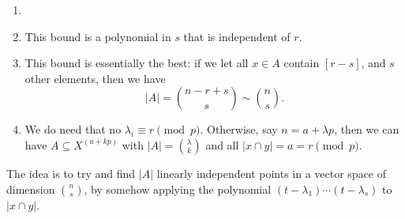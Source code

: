 \documentclass[12pt]{article}
\begin{document}
\begin{remark}
	\begin{enumerate}
		\item[]
		\item This bound is a polynomial in $s$ that is independent of $r$.
		\item This bound is essentially the best: if we let all $x \in A$ contain $[r - s]$, and $s$ other elements, then we have
			\[
				|A| = \binom{n-r+s}{s} \sim \binom ns.
			\]
		\item We do need that no $\lambda_i \equiv r \pmod p$. Otherwise, say $n = a + \lambda p$, then we can have $A \subseteq X^{(a + kp)}$ with $|A| = \binom \lambda k$ and all $|x \cap y| = a = r \pmod p$.
	\end{enumerate}
\end{remark}

The idea is to try and find $|A|$ linearly independent points in a vector space of dimension $\binom ns$, by somehow applying the polynomial $(t - \lambda_1) \cdots (t - \lambda_s)$ to $|x \cap y|$.
\end{document}
